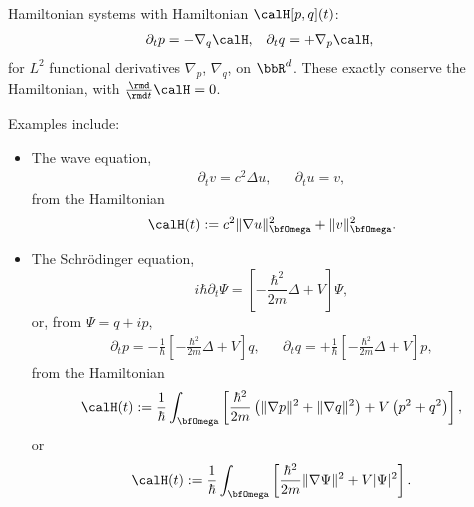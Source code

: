     \begin{example}
        Hamiltonian systems with Hamiltonian $\calH[p, q](t)$:
        \begin{align}
            \partial_{t}p  =  - \nabla_{q}\calH,  &&
            \partial_{t}q  =  + \nabla_{p}\calH,
        \end{align}
        for $L^{2}$ functional derivatives $\nabla_{p}$, $\nabla_{q}$, on $\bbR^{d}$. These exactly conserve the Hamiltonian, with $\frac{\rmd}{\rmd t}\calH  =  0$.

        Examples include:
        \begin{itemize}
            \item  The wave equation,
            \begin{align}
                \partial_{t}v  =  c^{2}\Delta u,  &&
                \partial_{t}u  =  v,
            \end{align}
            from the Hamiltonian
            \begin{equation}
                \calH(t)  :=  c^{2}\|\nabla u\|_{\bfOmega}^{2} + \|v\|_{\bfOmega}^{2}.
            \end{equation}
            \item  The Schrödinger equation,
            \begin{equation}
                i\hbar\partial_{t}\Psi  =  \left[- \frac{\hbar^{2}}{2m}\Delta + V\right]\Psi,
            \end{equation}
            or, from $\Psi  =  q + ip$,
            \begin{align}
                \partial_{t}p  =  - \frac{1}{\hbar}\left[- \frac{\hbar^{2}}{2m}\Delta + V\right]q,  &&
                \partial_{t}q  =  + \frac{1}{\hbar}\left[- \frac{\hbar^{2}}{2m}\Delta + V\right]p,
            \end{align}
            from the Hamiltonian
            \begin{equation}
                \calH(t)  :=  \frac{1}{\hbar}\int_{\bfOmega}\left[\frac{\hbar^{2}}{2m}\left(\|\nabla p\|^{2} + \|\nabla q\|^{2}\right) + V\left(p^{2} + q^{2}\right)\right],
            \end{equation}
            or
            \begin{equation}
                \calH(t)  :=  \frac{1}{\hbar}\int_{\bfOmega}\left[\frac{\hbar^{2}}{2m}\|\nabla\Psi\|^{2} + V|\Psi|^{2}\right].
            \end{equation}
        \end{itemize}
    \end{example}


